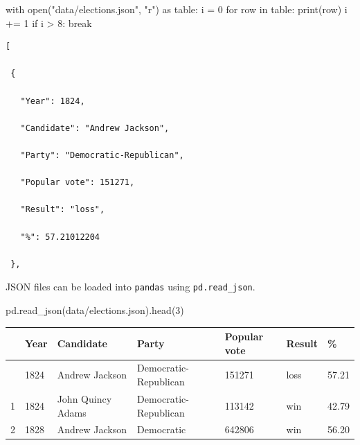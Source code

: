 \documentclass[
  letterpaper,
  DIV=11,
  numbers=noendperiod]{scrreprt}
\newenvironment{Shaded}{\begin{snugshade}}{\end{snugshade}}
\newcommand{\BuiltInTok}[1]{\textcolor[rgb]{0.00,0.23,0.31}{#1}}
\newcommand{\ControlFlowTok}[1]{\textcolor[rgb]{0.00,0.23,0.31}{#1}}
\newcommand{\DecValTok}[1]{\textcolor[rgb]{0.68,0.00,0.00}{#1}}
\newcommand{\ImportTok}[1]{\textcolor[rgb]{0.00,0.46,0.62}{#1}}
\newcommand{\KeywordTok}[1]{\textcolor[rgb]{0.00,0.23,0.31}{#1}}
\newcommand{\NormalTok}[1]{\textcolor[rgb]{0.00,0.23,0.31}{#1}}
\newcommand{\OperatorTok}[1]{\textcolor[rgb]{0.37,0.37,0.37}{#1}}
\newcommand{\StringTok}[1]{\textcolor[rgb]{0.13,0.47,0.30}{#1}}
\begin{document}
\begin{Shaded}
\begin{Highlighting}[]
\ControlFlowTok{with} \BuiltInTok{open}\NormalTok{(}\StringTok{"data/elections.json"}\NormalTok{, }\StringTok{"r"}\NormalTok{) }\ImportTok{as}\NormalTok{ table:}
\NormalTok{    i }\OperatorTok{=} \DecValTok{0}
    \ControlFlowTok{for}\NormalTok{ row }\KeywordTok{in}\NormalTok{ table:}
        \BuiltInTok{print}\NormalTok{(row)}
\NormalTok{        i }\OperatorTok{+=} \DecValTok{1}
        \ControlFlowTok{if}\NormalTok{ i }\OperatorTok{\textgreater{}} \DecValTok{8}\NormalTok{:}
            \ControlFlowTok{break}
\end{Highlighting}
\end{Shaded}

\begin{verbatim}
[

 {

   "Year": 1824,

   "Candidate": "Andrew Jackson",

   "Party": "Democratic-Republican",

   "Popular vote": 151271,

   "Result": "loss",

   "%": 57.21012204

 },
\end{verbatim}

JSON files can be loaded into \texttt{pandas} using
\texttt{pd.read\_json}.

\begin{Shaded}
\begin{Highlighting}[]
\NormalTok{pd.read\_json(}\StringTok{\textquotesingle{}data/elections.json\textquotesingle{}}\NormalTok{).head(}\DecValTok{3}\NormalTok{)}
\end{Highlighting}
\end{Shaded}

\begin{longtable}[]{@{}lllllll@{}}
\toprule\noalign{}
& Year & Candidate & Party & Popular vote & Result & \% \\
\midrule\noalign{}
\endhead
\bottomrule\noalign{}
\endlastfoot
0 & 1824 & Andrew Jackson & Democratic-Republican & 151271 & loss &
57.21 \\
1 & 1824 & John Quincy Adams & Democratic-Republican & 113142 & win &
42.79 \\
2 & 1828 & Andrew Jackson & Democratic & 642806 & win & 56.20 \\
\end{longtable}
\end{document}
